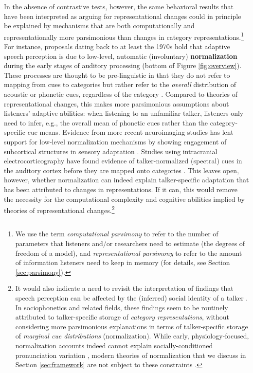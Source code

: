\documentclass[
  11pt,
  man,floatsintext]{apa6}
\begin{document}
In the absence of contrastive tests, however, the same behavioral results that have been interpreted as arguing for representational changes could in principle be explained by mechanisms that are both computationally and representationally more parsimonious than changes in category representations.\footnote{We use the term \emph{computational parsimony} to refer to the number of parameters that listeners and/or researchers need to estimate (the degrees of freedom of a model), and \emph{representational parsimony} to refer to the amount of information listeners need to keep in memory (for details, see Section \ref{sec:parsimony}).} For instance, proposals dating back to at least the 1970s hold that adaptive speech perception is due to low-level, automatic (involuntary) \textbf{normalization} during the early stages of auditory processing (bottom of Figure \ref{fig:overview}). These processes are thought to be pre-linguistic in that they do not refer to mapping from cues to categories but rather refer to the \emph{overall} distribution of acoustic or phonetic cues, regardless of the category \autocites[for reviews,][]{johnson-sjerps2021,stilp2020}. Compared to theories of representational changes, this makes more parsimonious assumptions about listeners' adaptive abilities: when listening to an unfamiliar talker, listeners only need to infer, e.g., the overall mean of phonetic cues rather than the category-specific cue means. Evidence from more recent neuroimaging studies has lent support for low-level normalization mechanisms by showing engagement of subcortical structures in sensory adaptation \autocites[e.g., the brain stem,][]{skoe2021auditory}[and cerebellum,][]{guediche2015evidence}[for review, see][]{guediche2014}. Studies using intracranial electrocorticography have found evidence of talker-normalized (spectral) cues in the auditory cortex before they are mapped onto categories \autocites[e.g.,][]{sjerps2019,tang2017}. This leaves open, however, whether normalization can indeed explain talker-specific adaptation that has been attributed to changes in representations. If it can, this would remove the necessity for the computational complexity and cognitive abilities implied by theories of representational changes.\footnote{It would also indicate a need to revisit the interpretation of findings that speech perception can be affected by the (inferred) social identity of a talker \autocites[e.g., regional origin,][]{hay-drager2010,niedzielski1999}[sex,][]{johnson1999,strand1999}[age,][]{skoogwaller2015,walker-hay2011}[and individual identity,][]{nygaard1994,remez2018}. In sociophonetics and related fields, these findings seem to be routinely attributed to talker-specific storage of \emph{category representations}, without considering more parsimonious explanations in terms of talker-specific storage of \emph{marginal cue distributions} (normalization). While early, physiology-focused, normalization accounts indeed cannot explain socially-conditioned pronunciation variation \autocite[see, e.g.,][]{johnson2006}, modern theories of normalization that we discuss in Section \ref{sec:framework} are not subject to these constraints \autocites[see also][]{magnuson-nusbaum2007,pisoni1997}.}
\end{document}
